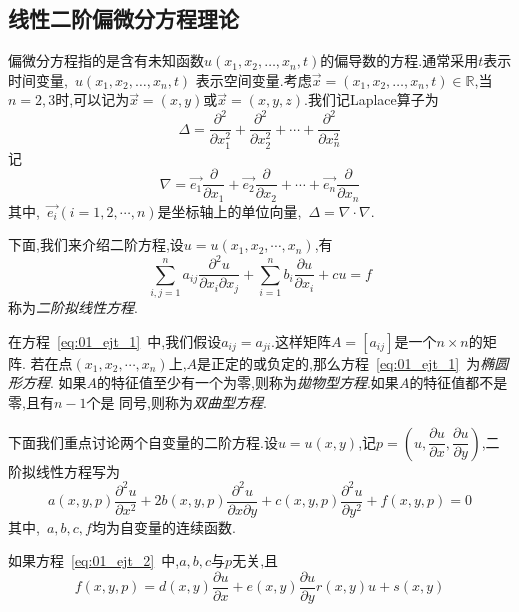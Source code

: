 \subsection{线性二阶偏微分方程理论}
偏微分方程指的是含有未知函数$u(x_1,x_2,\ldots,x_n,t)$的偏导数的方程.通常采用$t$表示时间变量,~$u(x_1,x_2,\ldots,x_n,t)$
表示空间变量.考虑$\vec{x}=(x_1,x_2,\ldots,x_n,t)\in \mathbb{R}$,当$n=2,3$时,可以记为$\vec{x}=(x,y)$或$\vec{x}=
(x,y,z)$.我们记Laplace算子为
\begin{equation*}
 \Delta = \dfrac{\partial^2}{\partial x_1^2}+\dfrac{\partial^2}{\partial x_2^2}+\cdots +  \dfrac{\partial^2}{\partial x_n^2}
\end{equation*}
记
\begin{equation*}
 \nabla = \vec{e_1}\dfrac{\partial}{\partial x_1}+\vec{e_2}\dfrac{\partial}{\partial x_2}
	  +\cdots + \vec{e_n}\dfrac{\partial}{\partial x_n}
\end{equation*}
其中,~$\vec{e_i}(i=1,2,\cdots,n)$是坐标轴上的单位向量,~$\Delta=\nabla\cdot\nabla$.\par
下面,我们来介绍二阶方程,设$u=u(x_1,x_2,\cdots,x_n)$,有
\begin{equation}\label{eq:01_ejt_1}
 \sum_{i,j=1}^{n}a_{ij}\dfrac{\partial^2 u}{\partial x_i \partial x_j}
 +\sum_{i=1}^{n} b_i\dfrac{\partial u}{\partial x_i} + cu=f
\end{equation}
称为\emph{二阶拟线性方程}.\par
在方程~\ref{eq:01_ejt_1}~中,我们假设$a_{ij}=a_{ji}$.这样矩阵$A=[a_{ij}]$是一个$n\times n$的矩阵.
若在点$(x_1,x_2,\cdots,x_n)$上,$A$是正定的或负定的,那么方程~\ref{eq:01_ejt_1}~为\emph{椭圆形方程}.
如果$A$的特征值至少有一个为零,则称为\emph{拋物型方程}.如果$A$的特征值都不是零,且有$n-1$个是
同号,则称为\emph{双曲型方程}.\par
下面我们重点讨论两个自变量的二阶方程.设$u=u(x,y)$,记$p=\left(u,\dfrac{\partial u}{\partial x},
\dfrac{\partial u}{\partial y}\right)$,二阶拟线性方程写为
\begin{equation}\label{eq:01_ejt_2}
 a(x,y,p)\dfrac{\partial^2 u}{\partial x^2}+2b(x,y,p)\dfrac{\partial^2 u}{\partial x\partial y}
 +c(x,y,p)\dfrac{\partial^2 u}{\partial y^2}+f(x,y,p)=0
\end{equation}
其中,~$a,b,c,f$均为自变量的连续函数.\par
如果方程~\ref{eq:01_ejt_2}~中,$a,b,c$与$p$无关,且
\begin{equation}
 f(x,y,p)=d(x,y)\dfrac{\partial u}{\partial x}+e(x,y)\dfrac{\partial u}{\partial y}
	  r(x,y)u+s(x,y)
\end{equation}
